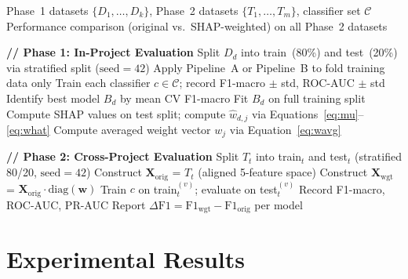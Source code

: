 \documentclass[12pt, a4paper]{article}
\begin{document}
\begin{algorithm}[H]
\caption{SHAP-Guided Cross-Project SDP Pipeline}
\label{alg:pipeline}
\begin{algorithmic}[1]
\Input Phase~1 datasets $\{D_1,\ldots,D_k\}$,
       Phase~2 datasets $\{T_1,\ldots,T_m\}$,
       classifier set $\mathcal{C}$
\Output Performance comparison (original vs.\ SHAP-weighted) on all
        Phase~2 datasets

\vspace{3pt}
\State \textbf{// Phase 1: In-Project Evaluation}
  \State Split $D_d$ into train~(80\%) and test~(20\%) via stratified split
         ($\text{seed}=42$)
    \State Apply Pipeline~A or Pipeline~B to fold training data only
    \State Train each classifier $c \in \mathcal{C}$; record F1-macro
           $\pm$ std, ROC-AUC $\pm$ std
  \EndFor
  \State Identify best model $B_d$ by mean CV F1-macro
  \State Fit $B_d$ on full training split
  \State Compute SHAP values on test split; compute $\hat{w}_{d,j}$
         via Equations~\eqref{eq:mu}--\eqref{eq:what}
\EndFor
\State Compute averaged weight vector $w_j$ via Equation~\eqref{eq:wavg}

\vspace{3pt}
\State \textbf{// Phase 2: Cross-Project Evaluation}
  \State Split $T_t$ into train$_t$ and test$_t$ (stratified 80/20,
         $\text{seed}=42$)
  \State Construct $\mathbf{X}_\text{orig}$ = $T_t$ (aligned 5-feature space)
  \State Construct $\mathbf{X}_\text{wgt}$ = $\mathbf{X}_\text{orig}
         \cdot \mathrm{diag}(\mathbf{w})$
      \State Train $c$ on train$_t^{(v)}$; evaluate on test$_t^{(v)}$
      \State Record F1-macro, ROC-AUC, PR-AUC
    \EndFor
  \EndFor
  \State Report $\Delta\text{F1} = \text{F1}_\text{wgt} - \text{F1}_\text{orig}$
         per model
\EndFor
\end{algorithmic}
\end{algorithm}

\section{Experimental Results}
\label{sec:results}
\end{document}

